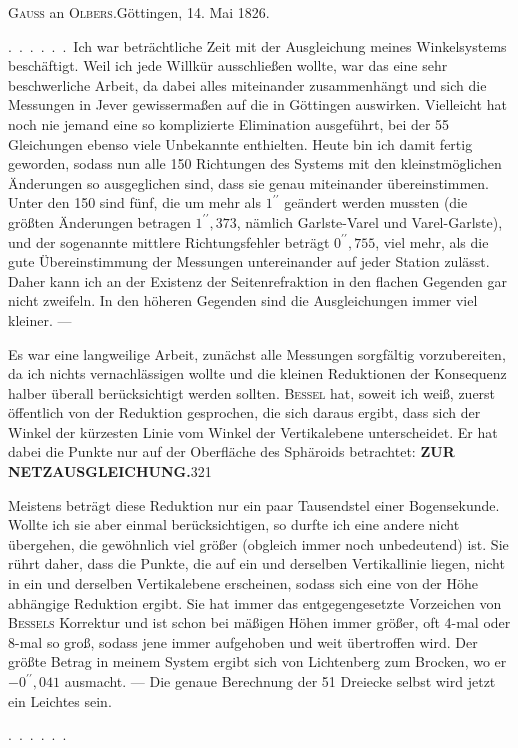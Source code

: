 \begin{center}\textsc{Gauss} an \textsc{Olbers}.\quad Göttingen, 14. Mai 1826.\end{center}

.\ .\ .\ .\ .\ .\ Ich war beträchtliche Zeit mit der Ausgleichung meines
Winkelsystems beschäftigt. Weil ich jede Willkür ausschließen wollte, war
das eine sehr beschwerliche Arbeit, da dabei alles miteinander zusammenhängt
und sich die Messungen in Jever gewissermaßen auf die in Göttingen auswirken.
Vielleicht hat noch nie jemand eine so komplizierte Elimination ausgeführt,
bei der 55 Gleichungen ebenso viele Unbekannte enthielten. Heute bin ich
damit fertig geworden, sodass nun alle 150 Richtungen des Systems mit den
kleinstmöglichen Änderungen so ausgeglichen sind, dass sie genau miteinander
übereinstimmen. Unter den 150 sind fünf, die um mehr als $1^{\prime\prime}$ geändert
werden mussten (die größten Änderungen betragen $1^{\prime\prime}{,}373$, nämlich
Garlste-Varel und Varel-Garlste), und der sogenannte mittlere Richtungsfehler
beträgt $0^{\prime\prime}{,}755$, viel mehr, als die gute Übereinstimmung der
Messungen untereinander auf jeder Station zulässt. Daher kann ich an der
Existenz der Seitenrefraktion in den flachen Gegenden gar nicht zweifeln.
In den höheren Gegenden sind die Ausgleichungen immer viel kleiner. ---

Es war eine langweilige Arbeit, zunächst alle Messungen sorgfältig vorzubereiten,
da ich nichts vernachlässigen wollte und die kleinen Reduktionen der Konsequenz
halber überall berücksichtigt werden sollten. \textsc{Bessel} hat, soweit ich
weiß, zuerst öffentlich von der Reduktion gesprochen, die sich daraus ergibt,
dass sich der Winkel der kürzesten Linie vom Winkel der Vertikalebene
unterscheidet. Er hat dabei die Punkte nur auf der Oberfläche des Sphäroids betrachtet:
\clearpage
\noindent\textbf{ZUR NETZAUSGLEICHUNG.}\hfill321\par\medskip
\noindent Meistens beträgt diese Reduktion nur ein paar Tausendstel einer
Bogensekunde. Wollte ich sie aber einmal berücksichtigen, so durfte ich eine andere
nicht übergehen, die gewöhnlich viel größer (obgleich immer noch unbedeutend)
ist. Sie rührt daher, dass die Punkte, die auf ein und derselben Vertikallinie
liegen, nicht in ein und derselben Vertikalebene erscheinen, sodass sich eine
von der Höhe abhängige Reduktion ergibt. Sie hat immer das entgegengesetzte
Vorzeichen von \textsc{Bessels} Korrektur und ist schon bei mäßigen Höhen immer
größer, oft 4-mal oder 8-mal so groß, sodass jene immer aufgehoben und
weit übertroffen wird. Der größte Betrag in meinem System ergibt sich
von Lichtenberg zum Brocken, wo er $-0^{\prime\prime}{,}041$ ausmacht. ---
Die genaue Berechnung der 51 Dreiecke selbst wird jetzt ein Leichtes sein.
\par\medskip
.\ .\ .\ .\ .\ .

